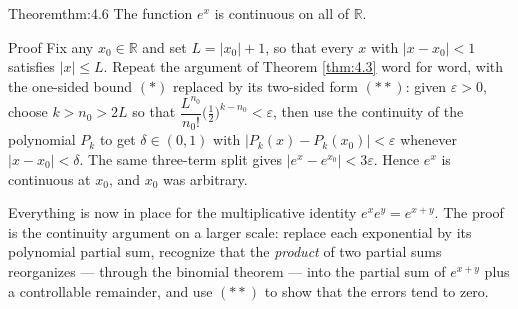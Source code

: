 \documentclass[a4paper,12pt,oneside]{memoir}
\begin{document}
\begin{envtheorem}{Theorem}{thm:4.6}{}
The function \(e^{x}\) is continuous on all of \(\mathbb{R}\).
\end{envtheorem}
\begin{envproof}{Proof}{}{}
Fix any \(x_{0} \in \mathbb{R}\) and set \(L = \lvert x_{0} \rvert + 1\), so that every \(x\) with \(\lvert x - x_{0} \rvert < 1\) satisfies \(\lvert x \rvert \le L\). Repeat the argument of Theorem \ref{thm:4.3} word for word, with the one-sided bound \((*)\) replaced by its two-sided form \((**)\): given \(\varepsilon > 0\), choose \(k > n_{0} > 2L\) so that \(\dfrac{L^{n_{0}}}{n_{0}!}\bigl(\tfrac{1}{2}\bigr)^{k - n_{0}} < \varepsilon\), then use the continuity of the polynomial \(P_{k}\) to get \(\delta \in (0, 1)\) with \(\lvert P_{k}(x) - P_{k}(x_{0}) \rvert < \varepsilon\) whenever \(\lvert x - x_{0} \rvert < \delta\). The same three-term split gives \(\lvert e^{x} - e^{x_{0}} \rvert < 3\varepsilon\). Hence \(e^{x}\) is continuous at \(x_{0}\), and \(x_{0}\) was arbitrary. \qedmark
\end{envproof}
Everything is now in place for the multiplicative identity \(e^{x} e^{y} = e^{x + y}\). The proof is the continuity argument on a larger scale: replace each exponential by its polynomial partial sum, recognize that the \emph{product} of two partial sums reorganizes — through the binomial theorem — into the partial sum of \(e^{x+y}\) plus a controllable remainder, and use \((**)\) to show that the errors tend to zero.
\end{document}
